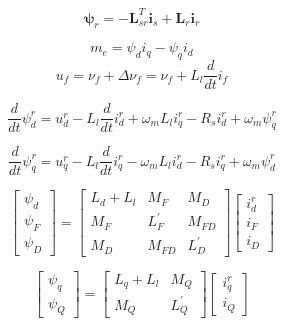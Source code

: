 \documentclass{scspaperproc}
\theoremstyle{scsthe}
\begin{document}
\begin{equation} \label{eq:lim_dependent_branch}
{\mathbf \psi}_{r} = -{\mathbf L}^T_{sr} {\mathbf i}_{s}+{\mathbf L}_{r} {\mathbf i}_{r}
\end{equation}

\begin{equation} \label{eq:lim_dependent_branch}
m_{e} = \psi_{d} i_{q}-\psi_{q} i_{d}
\end{equation}
\begin{equation}  \label{eq:sync1}
u_f = \nu_f + \Delta \nu_f = \nu_f + L_l \frac{d}{dt} i_f
\end{equation}


\begin{equation}  \label{eq:sync2}
\frac{d}{dt} \psi^r_d = u^r_d - L_l \frac{d}{dt} i^r_d + \omega_m L_l i^r_q - R_s i^r_d + \omega_m \psi^r_q
\end{equation}


\begin{equation}  \label{eq:sync3}
\frac{d}{dt} \psi^r_q = u^r_q - L_l \frac{d}{dt} i^r_q - \omega_m L_l i^r_d - R_s i^r_q + \omega_m \psi^r_d
\end{equation}


\begin{equation} \label{eq:sync4}
\begin{bmatrix}
\psi_d \\
\psi_F \\
\psi_D
\end{bmatrix}
= 
\begin{bmatrix}
L_d + L_l  &  M_F        &  M_D     \\
M_F        &  L^{'}_{F}  &  M_{FD}  \\
M_D        &  M_{FD}     &  L^{'}_D  
\end{bmatrix}
\begin{bmatrix}
i^r_d \\
i_F   \\
i_D   
\end{bmatrix}
\end{equation}

\begin{equation} \label{eq:sync5}
\begin{bmatrix}
\psi_q \\
\psi_Q
\end{bmatrix}
= 
\begin{bmatrix}
L_q + L_l  &  M_Q       \\   
M_Q        &  L^{'}_{Q}
\end{bmatrix}
\begin{bmatrix}
i^r_q \\
i_Q   
\end{bmatrix}
\end{equation}
\end{document}
